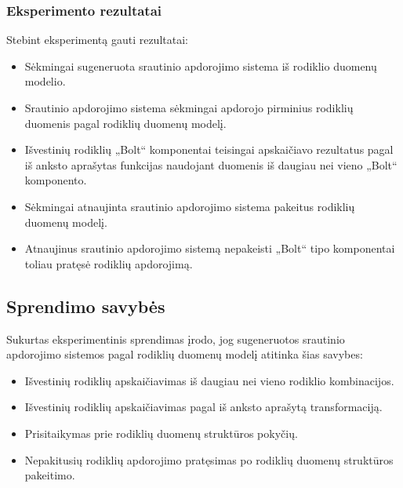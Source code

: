 \documentclass{VUMIFPSbakalaurinis}
\begin{document}
\subsubsection{Eksperimento rezultatai}
Stebint eksperimentą gauti rezultatai:
\begin{itemize}
    \item Sėkmingai sugeneruota srautinio apdorojimo sistema iš rodiklio duomenų modelio.
    \item Srautinio apdorojimo sistema sėkmingai apdorojo pirminius rodiklių duomenis pagal rodiklių duomenų modelį.
    \item Išvestinių rodiklių „Bolt“ komponentai teisingai apskaičiavo rezultatus pagal iš anksto aprašytas funkcijas naudojant duomenis iš daugiau nei vieno „Bolt“ komponento.
    \item Sėkmingai atnaujinta srautinio apdorojimo sistema pakeitus rodiklių duomenų modelį.
    \item Atnaujinus srautinio apdorojimo sistemą nepakeisti „Bolt“ tipo komponentai toliau pratęsė rodiklių apdorojimą. 
\end{itemize}
\subsection{Sprendimo savybės}

Sukurtas eksperimentinis sprendimas įrodo, jog sugeneruotos srautinio apdorojimo sistemos pagal rodiklių duomenų modelį atitinka šias savybes:
\begin{itemize}
    \item Išvestinių rodiklių apskaičiavimas iš daugiau nei vieno rodiklio kombinacijos.
    \item Išvestinių rodiklių apskaičiavimas pagal iš anksto aprašytą transformaciją.
    \item Prisitaikymas prie rodiklių duomenų struktūros pokyčių. 
    \item Nepakitusių rodiklių apdorojimo pratęsimas po rodiklių duomenų struktūros pakeitimo.
\end{itemize} 

\end{document}
